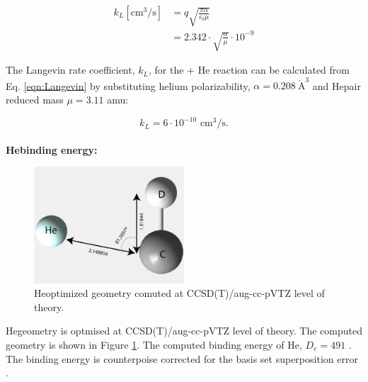 \begin{equation}
    \begin{split}
        k_L [\text{cm}^3 / \text{s}] & = q \sqrt{\frac{\pi \alpha}{\epsilon _0 \mu}} \\
        &= 2.342 \cdot \sqrt{ \frac{\alpha}{\mu}} \cdot 10^{-9} 
   \end{split}
   \label{eqn:Langevin}
\end{equation}


The Langevin rate coefficient, $k_L$, for the \CD + He reaction can be calculated from Eq. \ref{eqn:Langevin} by substituting helium polarizability, $\alpha=0.208\  \mathring{\text{A}}^3$ \cite{olney_absolute_1997} and He\CD pair reduced mass $\mu=3.11$ amu:

\begin{equation}
        k_L = 6 \cdot 10^{-10} \text{ cm}^3 / \text{s}.
   \label{eqn:Langevin-CD+}
\end{equation}
\\
\textbf{He\CD binding energy:}\label{discussions:binding-energy:CD+}\\

\begin{figure}[!htb]
    \centering
    \includegraphics[width=0.5\textwidth]{figures/measurements/kinetics/HeCD+_geometry.pdf}
    \caption{He\CD optimized geometry comuted at CCSD(T)/aug-cc-pVTZ level of theory.}
    \label{fig:HeCD_geometry}
\end{figure}

He\CD geometry is optmised at CCSD(T)/aug-cc-pVTZ level of theory. The computed geometry is shown in Figure \ref{fig:HeCD_geometry}. The computed binding energy of He\CD, $D_e=491$ \wn. The binding energy is counterpoise corrected for the basis set superposition error \cite{boys_calculation_1970}.




